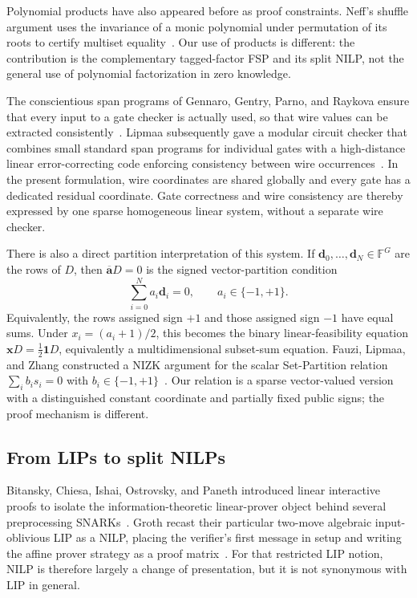 \documentclass[11pt]{article}
\theoremstyle{definition}
\newcommand{\F}{\mathbb F}
\begin{document}
Polynomial products have also appeared before as proof constraints.  Neff's
shuffle argument uses the invariance of a monic polynomial under permutation
of its roots to certify multiset equality~\cite{Neff01}.  Our use of products
is different: the contribution is the complementary tagged-factor FSP and its
split NILP, not the general use of polynomial factorization in zero knowledge.

The conscientious span programs of Gennaro, Gentry, Parno, and Raykova ensure
that every input to a gate checker is actually used, so that wire values can be
extracted consistently~\cite{GGPR13}.  Lipmaa subsequently gave a modular
circuit checker that combines small standard span programs for individual
gates with a high-distance linear error-correcting code enforcing consistency
between wire occurrences~\cite{Lipmaa13}.  In the present formulation, wire
coordinates are shared globally and every gate has a dedicated residual
coordinate.  Gate correctness and wire consistency are thereby expressed by
one sparse homogeneous linear system, without a separate wire checker.

There is also a direct partition interpretation of this system.  If
$\mathbf d_0,\ldots,\mathbf d_N\in\F^G$ are the rows of $D$, then
$\overline{\mathbf a}D=0$ is the signed vector-partition condition
\[
  \sum_{i=0}^{N} a_i\mathbf d_i=0,
  \qquad a_i\in\{-1,+1\}.
\]
Equivalently, the rows assigned sign $+1$ and those assigned sign $-1$ have
equal sums.  Under $x_i=(a_i+1)/2$, this becomes the binary linear-feasibility
equation $\mathbf xD=\frac12\mathbf 1D$, equivalently a multidimensional
subset-sum equation.  Fauzi, Lipmaa, and Zhang constructed a NIZK
argument for the scalar Set-Partition relation
$\sum_i b_i s_i=0$ with $b_i\in\{-1,+1\}$~\cite{FLZ13}.  Our relation is a
sparse vector-valued version with a distinguished constant coordinate and
partially fixed public signs; the proof mechanism is different.

\subsection{From LIPs to split NILPs}

Bitansky, Chiesa, Ishai, Ostrovsky, and Paneth introduced linear interactive
proofs to isolate the information-theoretic linear-prover object behind
several preprocessing SNARKs~\cite{BCI13}.  Groth recast their particular
two-move algebraic input-oblivious LIP as a NILP, placing the verifier's first
message in setup and writing the affine prover strategy as a proof
matrix~\cite{Groth16}.  For that restricted LIP notion, NILP is therefore
largely a change of presentation, but it is not synonymous with LIP in
general.
\end{document}
